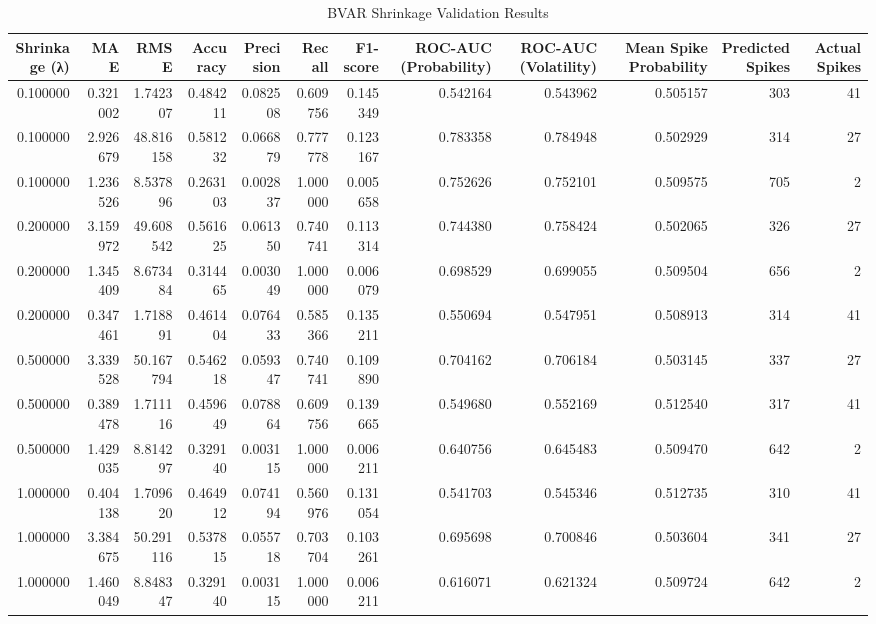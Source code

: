 \begin{table}
\caption{BVAR Shrinkage Validation Results}
\label{tab:4.8}
\begin{tabular}{rrrrrrrrrrrr}
\toprule
Shrinkage (λ) & MAE & RMSE & Accuracy & Precision & Recall & F1-score & ROC-AUC (Probability) & ROC-AUC (Volatility) & Mean Spike Probability & Predicted Spikes & Actual Spikes \\
\midrule
0.100000 & 0.321002 & 1.742307 & 0.484211 & 0.082508 & 0.609756 & 0.145349 & 0.542164 & 0.543962 & 0.505157 & 303 & 41 \\
0.100000 & 2.926679 & 48.816158 & 0.581232 & 0.066879 & 0.777778 & 0.123167 & 0.783358 & 0.784948 & 0.502929 & 314 & 27 \\
0.100000 & 1.236526 & 8.537896 & 0.263103 & 0.002837 & 1.000000 & 0.005658 & 0.752626 & 0.752101 & 0.509575 & 705 & 2 \\
0.200000 & 3.159972 & 49.608542 & 0.561625 & 0.061350 & 0.740741 & 0.113314 & 0.744380 & 0.758424 & 0.502065 & 326 & 27 \\
0.200000 & 1.345409 & 8.673484 & 0.314465 & 0.003049 & 1.000000 & 0.006079 & 0.698529 & 0.699055 & 0.509504 & 656 & 2 \\
0.200000 & 0.347461 & 1.718891 & 0.461404 & 0.076433 & 0.585366 & 0.135211 & 0.550694 & 0.547951 & 0.508913 & 314 & 41 \\
0.500000 & 3.339528 & 50.167794 & 0.546218 & 0.059347 & 0.740741 & 0.109890 & 0.704162 & 0.706184 & 0.503145 & 337 & 27 \\
0.500000 & 0.389478 & 1.711116 & 0.459649 & 0.078864 & 0.609756 & 0.139665 & 0.549680 & 0.552169 & 0.512540 & 317 & 41 \\
0.500000 & 1.429035 & 8.814297 & 0.329140 & 0.003115 & 1.000000 & 0.006211 & 0.640756 & 0.645483 & 0.509470 & 642 & 2 \\
1.000000 & 0.404138 & 1.709620 & 0.464912 & 0.074194 & 0.560976 & 0.131054 & 0.541703 & 0.545346 & 0.512735 & 310 & 41 \\
1.000000 & 3.384675 & 50.291116 & 0.537815 & 0.055718 & 0.703704 & 0.103261 & 0.695698 & 0.700846 & 0.503604 & 341 & 27 \\
1.000000 & 1.460049 & 8.848347 & 0.329140 & 0.003115 & 1.000000 & 0.006211 & 0.616071 & 0.621324 & 0.509724 & 642 & 2 \\
\bottomrule
\end{tabular}
\end{table}
